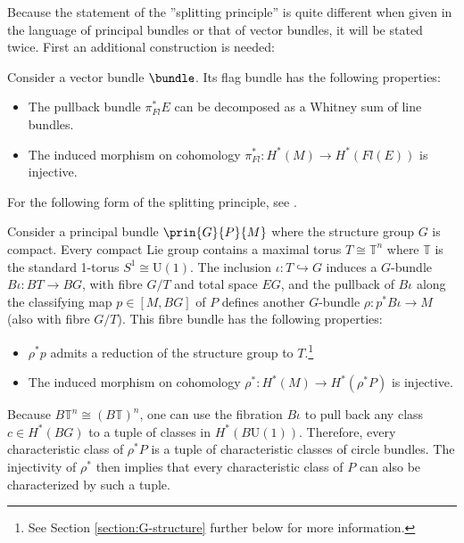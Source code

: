     Because the statement of the ''splitting principle'' is quite different when given in the language of principal bundles or that of vector bundles, it will be stated twice. First an additional construction is needed:
    \begin{theorem}
        Consider a vector bundle $\bundle$. Its flag bundle has the following properties:
        \begin{itemize}
            \item The pullback bundle $\pi_{Fl}^*E$ can be decomposed as a Whitney sum of line bundles.
            \item The induced morphism on cohomology $\pi_{Fl}^*:H^*(M)\rightarrow H^*(Fl(E))$ is injective.
        \end{itemize}
    \end{theorem}
    For the following form of the splitting principle, see \cite{may_splitting, debray_characteristic}.
    \begin{theorem}
        Consider a principal bundle $\prin{G}{P}{M}$ where the structure group $G$ is compact. Every compact Lie group contains a maximal torus $T\cong\mathbb{T}^n$ where $\mathbb{T}$ is the standard 1-torus $S^1\cong\text{U}(1)$. The inclusion $\iota:T\hookrightarrow G$ induces a $G$-bundle $B\iota:BT\rightarrow BG$, with fibre $G/T$ and total space $EG$, and the pullback of $B\iota$ along the classifying map $p\in[M,BG]$ of $P$ defines another $G$-bundle $\rho:p^*B\iota\rightarrow M$ (also with fibre $G/T$). This fibre bundle has the following properties:
        \begin{itemize}
            \item $\rho^*p$ admits a reduction of the structure group to $T$.\footnote{See Section \ref{section:G-structure} further below for more information.}
            \item The induced morphism on cohomology $\rho^*:H^*(M)\rightarrow H^*(\rho^*P)$ is injective.
        \end{itemize}
    \end{theorem}
    Because $B\mathbb{T}^n\cong(B\mathbb{T})^n$, one can use the fibration $B\iota$ to pull back any class $c\in H^*(BG)$ to a tuple of classes in $H^*(B\text{U}(1))$. Therefore, every characteristic class of $\rho^*P$ is a tuple of characteristic classes of circle bundles. The injectivity of $\rho^*$ then implies that every characteristic class of $P$ can also be characterized by such a tuple.

